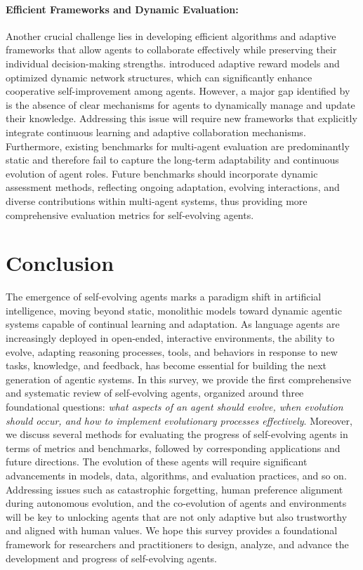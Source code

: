 \documentclass[10pt]{article} %
\begin{document}
\paragraph{Efficient Frameworks and Dynamic Evaluation:}
Another crucial challenge lies in developing efficient algorithms and adaptive frameworks that allow agents to collaborate effectively while preserving their individual decision-making strengths. \citep{hu2024self} introduced adaptive reward models and optimized dynamic network structures, which can significantly enhance cooperative self-improvement among agents. However, a major gap identified by \citep{sun2025collab} is the absence of clear mechanisms for agents to dynamically manage and update their knowledge. Addressing this issue will require new frameworks that explicitly integrate continuous learning and adaptive collaboration mechanisms. Furthermore, existing benchmarks for multi-agent evaluation are predominantly static \citep{zhu2025multiagentbench} and therefore fail to capture the long-term adaptability and continuous evolution of agent roles. Future benchmarks should incorporate dynamic assessment methods, reflecting ongoing adaptation, evolving interactions, and diverse contributions within multi-agent systems, thus providing more comprehensive evaluation metrics for self-evolving agents.




\section{Conclusion}

The emergence of self-evolving agents marks a paradigm shift in artificial intelligence, moving beyond static, monolithic models toward dynamic agentic systems capable of continual learning and adaptation. As language agents are increasingly deployed in open-ended, interactive environments, the ability to evolve, adapting reasoning processes, tools, and behaviors in response to new tasks, knowledge, and feedback, has become essential for building the next generation of agentic systems. In this survey, we provide the first comprehensive and systematic review of self-evolving agents, organized around three foundational questions: \textit{what aspects of an agent should evolve, when evolution should occur, and how to implement evolutionary processes effectively}. Moreover, we discuss several methods for evaluating the progress of self-evolving agents in terms of metrics and benchmarks, followed by corresponding applications and future directions. 
The evolution of these agents will require significant advancements in models, data, algorithms, and evaluation practices, and so on.  Addressing issues such as catastrophic forgetting, human preference alignment during autonomous evolution, and the co-evolution of agents and environments will be key to unlocking agents that are not only adaptive but also trustworthy and aligned with human values. We hope this survey provides a foundational framework for researchers and practitioners to design, analyze, and advance the development and progress of self-evolving agents.







\end{document}
